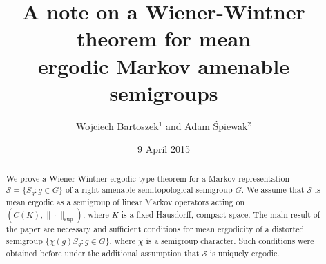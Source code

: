 \documentclass{amsart}
\theoremstyle{definition}
\theoremstyle{remark}
\numberwithin{equation}{section}
\begin{document}
\title {A note on a Wiener-Wintner theorem for mean \\ ergodic Markov amenable semigroups }

\author {Wojciech Bartoszek$^1$ and Adam \'Spiewak$^2$ }

\address {Department of Mathematics, Gda\'nsk University of Technology,
\newline ul. Narutowicza 11/12, 80 233 Gda\'nsk, Poland}









\date {9 April 2015}




\begin{abstract}

We prove a Wiener-Wintner ergodic type theorem for a Markov representation $ \mathcal{S} =  \{ S_g : g\in G \}$ of a right amenable semitopological semigroup $G$. We assume that $\mathcal{S}$ is mean ergodic as a semigroup of linear Markov operators acting on $(C(K), \| \cdot \|_{\sup })$, where $K$ is a fixed Hausdorff, compact space. The main result of the paper are necessary and sufficient conditions for mean ergodicity of a distorted  semigroup  $\{ \chi(g)S_g : g\in G \}$, where $\chi $ is a semigroup character. Such conditions were obtained before under the additional assumption that $\mathcal{S}$ is uniquely ergodic.

\end{abstract}

\maketitle


\pagestyle{myheadings}



\end{document}
